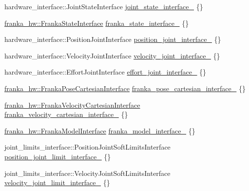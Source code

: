 \begin{DoxyCompactItemize}
\item 
hardware\+\_\+interface\+::\+Joint\+State\+Interface \hyperlink{classfranka__hw_1_1FrankaHW_a71a3f8c221792e3d833ac3d50e61a8fc}{joint\+\_\+state\+\_\+interface\+\_\+} \{\}
\item 
\hyperlink{classfranka__hw_1_1FrankaStateInterface}{franka\+\_\+hw\+::\+Franka\+State\+Interface} \hyperlink{classfranka__hw_1_1FrankaHW_ac14c76285bdd23c99a2dc60b09c862cc}{franka\+\_\+state\+\_\+interface\+\_\+} \{\}
\item 
hardware\+\_\+interface\+::\+Position\+Joint\+Interface \hyperlink{classfranka__hw_1_1FrankaHW_aed81f869c0785e8257c9b21ce3a54f48}{position\+\_\+joint\+\_\+interface\+\_\+} \{\}
\item 
hardware\+\_\+interface\+::\+Velocity\+Joint\+Interface \hyperlink{classfranka__hw_1_1FrankaHW_aae00e8f592019644703aaebcc8b6d8db}{velocity\+\_\+joint\+\_\+interface\+\_\+} \{\}
\item 
hardware\+\_\+interface\+::\+Effort\+Joint\+Interface \hyperlink{classfranka__hw_1_1FrankaHW_a5f695d0eb767c02397372cb5536db00c}{effort\+\_\+joint\+\_\+interface\+\_\+} \{\}
\item 
\hyperlink{classfranka__hw_1_1FrankaPoseCartesianInterface}{franka\+\_\+hw\+::\+Franka\+Pose\+Cartesian\+Interface} \hyperlink{classfranka__hw_1_1FrankaHW_ad64e463f182494a979b27f03fd1ecaee}{franka\+\_\+pose\+\_\+cartesian\+\_\+interface\+\_\+} \{\}
\item 
\hyperlink{classfranka__hw_1_1FrankaVelocityCartesianInterface}{franka\+\_\+hw\+::\+Franka\+Velocity\+Cartesian\+Interface} \hyperlink{classfranka__hw_1_1FrankaHW_a4844a25f394fcd8f382d1af741dc32e8}{franka\+\_\+velocity\+\_\+cartesian\+\_\+interface\+\_\+} \{\}
\item 
\hyperlink{classfranka__hw_1_1FrankaModelInterface}{franka\+\_\+hw\+::\+Franka\+Model\+Interface} \hyperlink{classfranka__hw_1_1FrankaHW_ae4a34d7a0b75467c137d9820a37fea79}{franka\+\_\+model\+\_\+interface\+\_\+} \{\}
\item 
joint\+\_\+limits\+\_\+interface\+::\+Position\+Joint\+Soft\+Limits\+Interface \hyperlink{classfranka__hw_1_1FrankaHW_a0453d8d00992ae08ddd47083a21abcc8}{position\+\_\+joint\+\_\+limit\+\_\+interface\+\_\+} \{\}
\item 
joint\+\_\+limits\+\_\+interface\+::\+Velocity\+Joint\+Soft\+Limits\+Interface \hyperlink{classfranka__hw_1_1FrankaHW_a4e85e4440436f97a169553d281049e4e}{velocity\+\_\+joint\+\_\+limit\+\_\+interface\+\_\+} \{\}

\end{DoxyCompactItemize}
